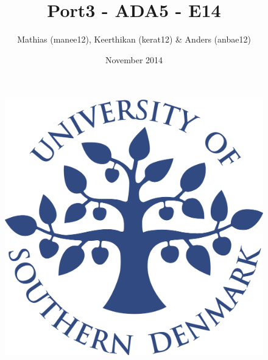 \title{Port3 - ADA5 - E14}
\author{Mathias (manee12), Keerthikan (kerat12) \& Anders (anbae12)}
\date{November 2014}
\begin{figure}
\centering
\includegraphics[width=1\textwidth]{graphics/forside.png}
\end{figure}
\maketitle
